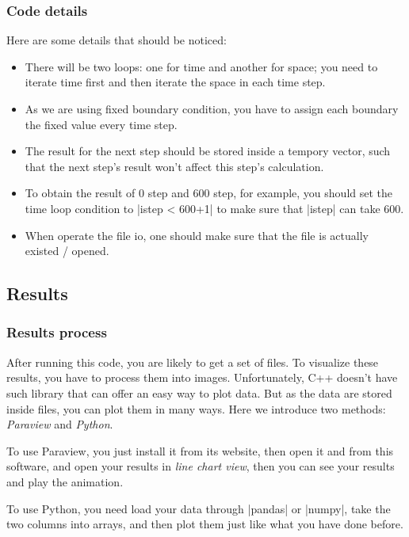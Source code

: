 \documentclass[compress,xcolor={dvipsnames}]{beamer}
\begin{document}
\begin{frame}[fragile]
    \frametitle{Code details}

    Here are some details that should be noticed:
    \begin{itemize}
        \item There will be two loops: one for time and another for space; you need to iterate time first and then iterate the space in each time step.
        \item As we are using fixed boundary condition, you have to assign each boundary the fixed value every time step.
        \item The result for the next step should be stored inside a tempory vector, such that the next step's result won't affect this step's calculation.
        \item To obtain the result of 0 step and 600 step, for example, you should set the time loop condition to \cverb|istep < 600+1| to make sure that \cverb|istep| can take 600.
        \item When operate the file io, one should make sure that the file is actually existed / opened.
    \end{itemize}

\end{frame}

\subsection{Results}

\begin{frame}[fragile]
    \frametitle{Results process}

    After running this code, you are likely to get a set of files. To visualize these results, you have to process them into images. Unfortunately, C++ doesn't have such library that can offer an easy way to plot data. But as the data are stored inside files, you can plot them in many ways. Here we introduce two methods: \emph{Paraview} and \emph{Python}.

    To use Paraview, you just install it from its website, then open it and from this software, and open your results in \emph{line chart view}, then you can see your results and play the animation.

    To use Python, you need load your data through \cverb|pandas| or \cverb|numpy|, take the two columns into arrays, and then plot them just like what you have done before.

\end{frame}
\end{document}

